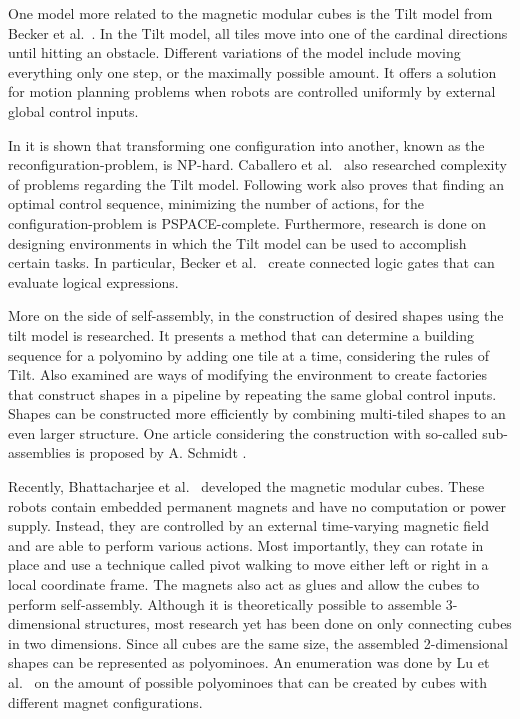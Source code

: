 One model more related to the magnetic modular cubes is the Tilt model from Becker et al.\ \cite{Becker2014_SP}.
In the Tilt model, all tiles move into one of the cardinal directions until hitting an obstacle.
Different variations of the model include moving everything only one step, or the maximally possible amount.
It offers a solution for motion planning problems when robots are controlled uniformly by external global control inputs.

\newpage

In \cite{Becker2014_SP} it is shown that transforming one configuration into another, known as the reconfiguration-problem, is NP-hard.
Caballero et al.\ \cite{caballero2020} also researched complexity of problems regarding the Tilt model.
Following work \cite{Becker2014} also proves that finding an optimal control sequence, minimizing the number of actions, for the configuration-problem is PSPACE-complete.
Furthermore, research is done on designing environments in which the Tilt model can be used to accomplish certain tasks.
In particular, Becker et al.\ \cite{Becker2014} create connected logic gates that can evaluate logical expressions.

More on the side of self-assembly, in \cite{Becker2020} the construction of desired shapes using the tilt model is researched.
It presents a method that can determine a building sequence for a polyomino by adding one tile at a time, considering the rules of Tilt.
Also examined are ways of modifying the environment to create factories that construct shapes in a pipeline by repeating the same global control inputs.
Shapes can be constructed more efficiently by combining multi-tiled shapes to an even larger structure.
One article considering the construction with so-called sub-assemblies is proposed by A. Schmidt \cite{Schmidt2018}.

Recently, Bhattacharjee et al.\ \cite{Bhattacharjee2022} developed the magnetic modular cubes.
These robots contain embedded permanent magnets and have no computation or power supply.
Instead, they are controlled by an external time-varying magnetic field and are able to perform various actions.
Most importantly, they can rotate in place and use a technique called pivot walking to move either left or right in a local coordinate frame.
The magnets also act as glues and allow the cubes to perform self-assembly.
Although it is theoretically possible to assemble 3-dimensional structures, most research yet has been done on only connecting cubes in two dimensions.
Since all cubes are the same size, the assembled 2-dimensional shapes can be represented as polyominoes.
An enumeration was done by Lu et al.\ \cite{Lu2021} on the amount of possible polyominoes that can be created by cubes with different magnet configurations.

